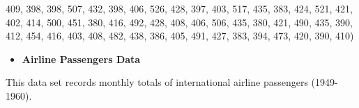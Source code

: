 \documentclass[
]{book}
\newenvironment{Shaded}{\begin{snugshade}}{\end{snugshade}}
\newcommand{\DecValTok}[1]{\textcolor[rgb]{0.00,0.00,0.81}{#1}}
\newcommand{\NormalTok}[1]{#1}
\providecommand{\tightlist}{%
  \setlength{\itemsep}{0pt}\setlength{\parskip}{0pt}}
\begin{document}
\begin{Shaded}
\begin{Highlighting}[]
          \DecValTok{409}\NormalTok{, }\DecValTok{398}\NormalTok{, }\DecValTok{398}\NormalTok{, }\DecValTok{507}\NormalTok{, }\DecValTok{432}\NormalTok{, }\DecValTok{398}\NormalTok{, }\DecValTok{406}\NormalTok{, }\DecValTok{526}\NormalTok{, }\DecValTok{428}\NormalTok{, }\DecValTok{397}\NormalTok{, }\DecValTok{403}\NormalTok{, }\DecValTok{517}\NormalTok{, }\DecValTok{435}\NormalTok{, }\DecValTok{383}\NormalTok{, }\DecValTok{424}\NormalTok{, }\DecValTok{521}\NormalTok{, }
          \DecValTok{421}\NormalTok{, }\DecValTok{402}\NormalTok{, }\DecValTok{414}\NormalTok{, }\DecValTok{500}\NormalTok{, }\DecValTok{451}\NormalTok{, }\DecValTok{380}\NormalTok{, }\DecValTok{416}\NormalTok{, }\DecValTok{492}\NormalTok{, }\DecValTok{428}\NormalTok{, }\DecValTok{408}\NormalTok{, }\DecValTok{406}\NormalTok{, }\DecValTok{506}\NormalTok{, }\DecValTok{435}\NormalTok{, }\DecValTok{380}\NormalTok{, }\DecValTok{421}\NormalTok{, }\DecValTok{490}\NormalTok{, }
          \DecValTok{435}\NormalTok{, }\DecValTok{390}\NormalTok{, }\DecValTok{412}\NormalTok{, }\DecValTok{454}\NormalTok{, }\DecValTok{416}\NormalTok{, }\DecValTok{403}\NormalTok{, }\DecValTok{408}\NormalTok{, }\DecValTok{482}\NormalTok{, }\DecValTok{438}\NormalTok{, }\DecValTok{386}\NormalTok{, }\DecValTok{405}\NormalTok{, }\DecValTok{491}\NormalTok{, }\DecValTok{427}\NormalTok{, }\DecValTok{383}\NormalTok{, }\DecValTok{394}\NormalTok{, }\DecValTok{473}\NormalTok{, }
          \DecValTok{420}\NormalTok{, }\DecValTok{390}\NormalTok{, }\DecValTok{410}\NormalTok{)}
\end{Highlighting}
\end{Shaded}

\begin{itemize}
\tightlist
\item
  \textbf{Airline Passengers Data}
\end{itemize}

This data set records monthly totals of international airline passengers (1949-1960).
\end{document}
